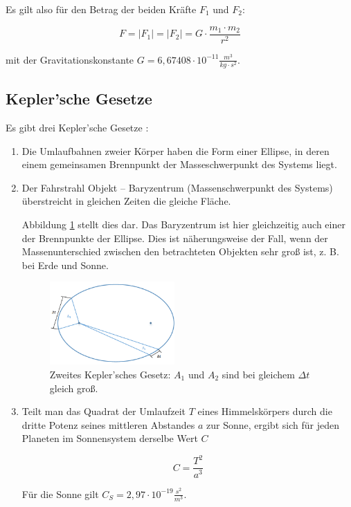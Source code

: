\documentclass[10pt,twocolumn]{scrartcl}
\newcommand{\abs}[1]{\ensuremath{\left\vert#1\right\vert}}
\begin{document}
Es gilt also für den Betrag der beiden Kräfte $F_1$ und $F_2$:

\begin{equation}F = \abs{F_1} = \abs{F_2} = G \cdot \frac{m_1 \cdot m_2}{r^2}
\label{eq:newton}
\end{equation}

mit der Gravitationskonstante $G = 6,67408 \cdot 10^{-11} \frac{m^3}{kg \cdot s^2}$.

\subsection{Kepler'sche Gesetze}
Es gibt drei Kepler'sche Gesetze \cite{Max-Planck-Gesellschaft2015} :
\begin{enumerate}
\item  Die Umlaufbahnen zweier Körper haben die Form einer Ellipse, in deren einem gemeinsamen Brennpunkt der Masseschwerpunkt des Systems liegt. 
\item Der Fahrstrahl Objekt -- Baryzentrum (Massenschwerpunkt des Systems) überstreicht in gleichen Zeiten die gleiche Fläche.

Abbildung \ref{fig:kepler2} stellt dies dar. Das Baryzentrum ist hier gleichzeitig auch einer der Brennpunkte der Ellipse. Dies ist näherungsweise der Fall, wenn der Massenunterschied zwischen den betrachteten Objekten sehr groß ist, z. B. bei Erde und Sonne.

\begin{figure}[t]
\centering
\includegraphics[width=0.45\textwidth]{Bilder/kepler2.png}
\caption{Zweites Kepler'sches Gesetz: $A_1$ und $A_2$ sind bei gleichem $\Delta t$ gleich groß.}
\label{fig:kepler2}
\end{figure}

\item Teilt man das Quadrat der Umlaufzeit $T$ eines Himmelskörpers durch die dritte Potenz seines mittleren Abstandes $a$ zur Sonne, ergibt sich für jeden Planeten im Sonnensystem derselbe Wert $C$

\begin{equation}C = \frac{T^2}{a^3}
\label{eq:kepler3}
\end{equation}

Für die Sonne gilt $C_S = 2,97 \cdot 10^{-19} \frac{s^2}{m^3}$.

\end{enumerate}
\end{document}
